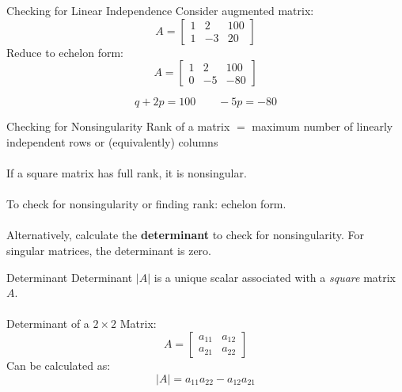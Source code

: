 \documentclass{./../../Latex/teaching_slides}
\begin{document}
\begin{frame}{Checking for Linear Independence}
Consider augmented matrix:
$$ A=\left[\begin{array}{cc|c}1 & 2 & 100 \\ 1 & -3 & 20\end{array}\right] $$
Reduce to echelon form:
$$ A=\left[\begin{array}{cc|c}1 & 2 & 100 \\ 0 & -5 & -80\end{array}\right] $$

$$ q+2p = 100 \quad \quad -5p = -80   $$
\end{frame}

\begin{frame}{Checking for Nonsingularity}
Rank of a matrix $=$ maximum number of linearly independent rows or (equivalently) columns \\~\\

If a square matrix has full rank, it is nonsingular. \\~\\

To check for nonsingularity or finding rank: echelon form. \\~\\

Alternatively, calculate the \textbf{determinant} to check for nonsingularity. For singular matrices, the determinant is zero. 
\end{frame}

 \begin{frame}{Determinant}
 Determinant $|A|$ is a unique scalar associated with a \textit{square} matrix $A$. \\~\\
 Determinant of a $2 \times 2$ Matrix:
 $$ A=\left[\begin{array}{ll}a_{11} & a_{12} \\ a_{21} & a_{22}\end{array}\right] $$
 Can be calculated as:
 $$ |A|=a_{11} a_{22}-a_{12} a_{21} $$  
 \end{frame}
\end{document}
